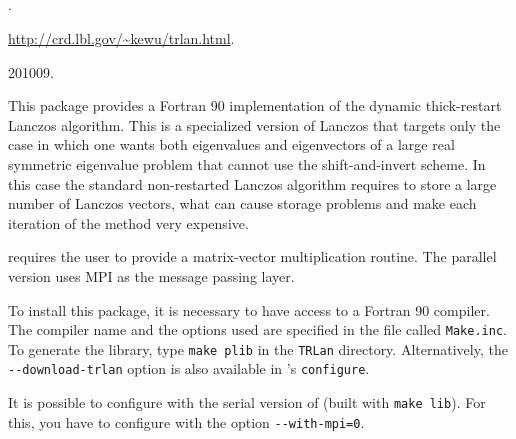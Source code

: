 \subsection*{\underline{\trlan}}
	\begin{description}
	\setlength{\itemsep}{0pt}
	\item[References.]\citep{Wu:2000:TLM}.
	\item[Website.] \url{http://crd.lbl.gov/\~kewu/trlan.html}.
	\item[Version.] 201009.
	\item[Summary.] This package provides a Fortran 90 implementation of the dynamic thick-restart Lanczos algorithm. This is a specialized version of Lanczos that targets only the case in which one wants both eigenvalues and eigenvectors of a large real symmetric eigenvalue problem that cannot use the shift-and-invert scheme. In this case the standard non-restarted Lanczos algorithm requires to store a large number of Lanczos vectors, what can cause storage problems and make each iteration of the method very expensive.

	\trlan{} requires the user to provide a matrix-vector multiplication routine. The parallel version uses MPI as the message passing layer.
	\item[Installation.] To install this package, it is necessary to have access to a Fortran 90 compiler. The compiler name and the options used are specified in the file called \texttt{Make.inc}. To generate the library, type \texttt{make plib} in the \texttt{TRLan} directory. Alternatively, the \texttt{-{}-download-trlan} option is also available in \slepc's \texttt{configure}.

	It is possible to configure \slepc with the serial version of \trlan (built with \texttt{make lib}). For this, you have to configure \petsc with the option \texttt{-{}-with-mpi=0}.
	\end{description}

